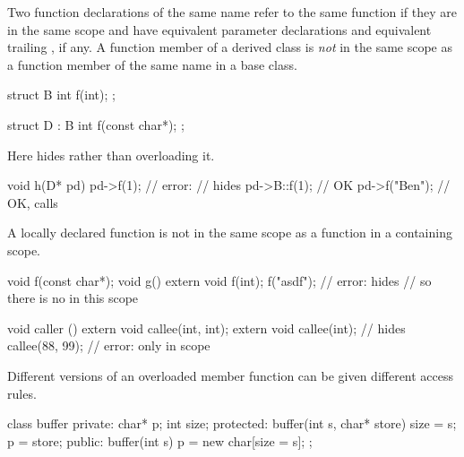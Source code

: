 \pnum
Two function declarations of the same name refer to the same function if they
are in the same scope and have equivalent parameter declarations
and equivalent trailing , if any.
A function member of a derived class is
\textit{not}
in the same scope as a function member of the same name in a base class.
\begin{example}

\begin{codeblock}
struct B {
  int f(int);
};

struct D : B {
  int f(const char*);
};
\end{codeblock}

%
%
Here
hides
rather than overloading it.

%
\begin{codeblock}
void h(D* pd) {
  pd->f(1);                     // error:
                                //  hides 
  pd->B::f(1);                  // OK
  pd->f("Ben");                 // OK, calls 
}
\end{codeblock}
\end{example}

\pnum
A locally declared function is not in the same scope as a function in
a containing scope.
\begin{example}

\begin{codeblock}
void f(const char*);
void g() {
  extern void f(int);
  f("asdf");                    // error:  hides 
                                // so there is no  in this scope
}

void caller () {
  extern void callee(int, int);
  {
    extern void callee(int);    // hides 
    callee(88, 99);             // error: only  in scope
  }
}
\end{codeblock}
\end{example}

\pnum
{}%
%
Different versions of an overloaded member function can be given different
access rules.
\begin{example}

\begin{codeblock}
class buffer {
private:
    char* p;
    int size;
protected:
    buffer(int s, char* store) { size = s; p = store; }
public:
    buffer(int s) { p = new char[size = s]; }
};
\end{codeblock}
\end{example}

